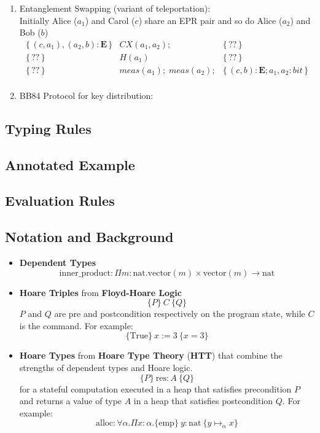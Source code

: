 \documentclass[acmsmall,nonacm,review,timestamp]{acmart}
\newcommand{\E}{\ensuremath{\mathbf{E}}\xspace}
\newcommand\hoare[3]{\{\,#1\,\}&#2&\{\,#3\,\}}
\begin{document}
\begin{enumerate}

	\item Entanglement Swapping (variant of teleportation):\\
	Initially Alice ($a_1$) and Carol ($c$) share an EPR pair and so do Alice ($a_2$) and Bob ($b$)
\[ \begin{array}{rcl}
\hoare{(c, a_1), (a_2, b): \E}{CX(a_1, a_2);}{??} \\
\hoare{??}{H(a_1)}{??}\\
\hoare{??}{meas(a_1); \; meas(a_2);}{(c,b): \E; a_1, a_2 : bit}\\
\end{array} \]

\item BB84 Protocol for key distribution:
\end{enumerate}


\subsection{Typing Rules}

\subsection{Annotated Example}

\subsection{Evaluation Rules}

\subsection{Notation and Background}
\begin{itemize}
	\item \textbf{Dependent Types}
	\[ \mathrm{inner\_product}: \Pi m: \mathrm{nat}.\mathrm{vector}(m) \times \mathrm{vector}(m) \rightarrow \mathrm{nat} \]

	\item \textbf{Hoare Triples} from \textbf{Floyd-Hoare Logic}
	\[ \{P\}\ C\ \{Q\} \]
	$P$ and $Q$ are pre and postcondition respectively on the program state, while $C$ is the command. For example:
	\[ \{\mathrm{True}\}\ x := 3\ \{x=3\} \]
	\item \textbf{Hoare Types} from \textbf{Hoare Type Theory} (\textbf{HTT}) that combine the strengths of dependent types and Hoare logic.
	\[ \{P\}\ \mathrm{res}:A\ \{Q\}\]
	for a stateful computation executed in a heap that satisfies precondition $P$ and returns a value of type $A$ in a heap that satisfies postcondition $Q$. For example:
	\[ \mathrm{alloc} : \forall \alpha . \Pi x : \alpha. \{\mathrm{emp}\}\ y : \mathrm{nat}\ \{ y \mapsto_{\alpha} x\}\]
\end{itemize}
\end{document}
